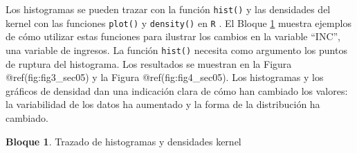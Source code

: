 \documentclass[
]{book}
\theoremstyle{definition}
\theoremstyle{definition}
\newtheorem{example}{Bloque}[chapter]
\theoremstyle{definition}
\theoremstyle{definition}
\theoremstyle{remark}
\begin{document}
Los histogramas se pueden trazar con la función \texttt{hist()} y las densidades del kernel con las funciones \texttt{plot()} y \texttt{density()} en \texttt{R} . El Bloque \ref{exm:bloque11lbn} muestra ejemplos de cómo utilizar estas funciones para ilustrar los cambios en la variable ``INC'', una variable de ingresos. La función \texttt{hist()} necesita como argumento los puntos de ruptura del histograma. Los resultados se muestran en la Figura @ref(fig:fig3\_sec05) y la Figura @ref(fig:fig4\_sec05). Los histogramas y los gráficos de densidad dan una indicación clara de cómo han cambiado los valores: la variabilidad de los datos ha aumentado y la forma de la distribución ha cambiado.

\begin{example}
\protect\hypertarget{exm:bloque11lbn}{}\label{exm:bloque11lbn}Trazado de histogramas y densidades kernel
\end{example}
\end{document}
